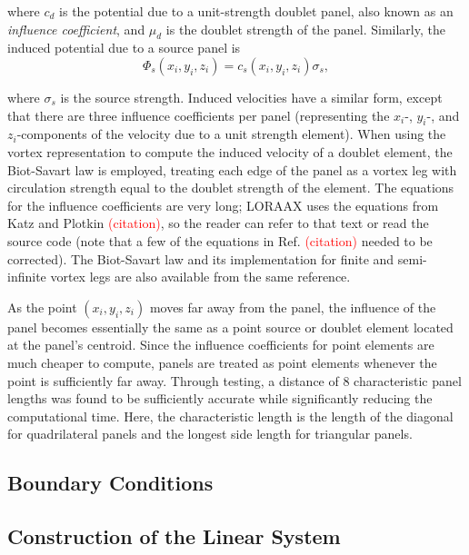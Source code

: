 \documentclass[11pt]{article}
\begin{document}
\noindent where $c_d$ is the potential due to a unit-strength doublet panel,
also known as an \textit{influence
coefficient}, and $\mu_d$ is the doublet strength of the panel. Similarly, the
induced potential due to a source panel is
\begin{equation}
	\Phi_s(x_i,y_i,z_i) = c_s(x_i,y_i,z_i)\sigma_s,
	\label{eq:source}
\end{equation}

\noindent where $\sigma_s$ is the source strength. Induced velocities have a
similar form, except that there are three influence coefficients per panel
(representing
the $x_i$-, $y_i$-, and $z_i$-components of the velocity due to a unit strength
element). When using the vortex representation to compute the induced velocity
of a doublet element, the Biot-Savart law is employed, treating each edge of
the panel as a vortex leg with circulation strength equal to the doublet
strength of the element. The equations for the influence coefficients are
very long; LORAAX uses the equations from Katz and Plotkin
\textcolor{red}{(citation)}, so the reader can refer to that text or read the
source code (note that a few of the equations in Ref.
\textcolor{red}{(citation)} needed to be corrected). The Biot-Savart law and its
implementation for finite and semi-infinite vortex legs are also available from
the same reference.

As the point $(x_i, y_i, z_i)$ moves far away from the panel, the influence of
the panel becomes essentially the same as a point source or doublet element
located at the panel's centroid.
Since the influence coefficients for point elements are much cheaper to
compute, panels are treated as point elements whenever the point is sufficiently
far away. Through testing, a distance of 8 characteristic panel lengths was
found to be sufficiently accurate while significantly reducing the computational
time. Here, the characteristic length is the length of the diagonal for
quadrilateral panels and the longest side length for triangular panels.

\subsection{Boundary Conditions}

\subsection{Construction of the Linear System}\label{sec:system}
\end{document}
